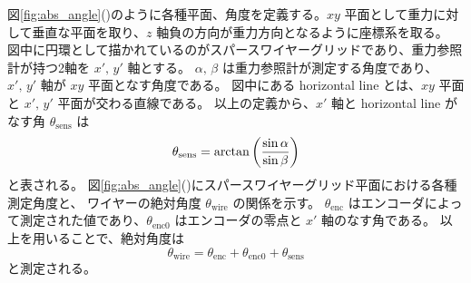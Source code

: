 \documentclass[../../main.tex]{subfiles}
\begin{document}
図\ref{fig:abs_angle}()のように各種平面、角度を定義する。$xy$ 平面として重力に対して垂直な平面を取り、$z$ 軸負の方向が重力方向となるように座標系を取る。
図中に円環として描かれているのがスパースワイヤーグリッドであり、重力参照計が持つ2軸を $x',\,y'$ 軸とする。
$\alpha,\,\beta$ は重力参照計が測定する角度であり、$x',\,y'$ 軸が $xy$ 平面となす角度である。
図中にある horizontal line とは、$xy$ 平面と $x',\,y'$ 平面が交わる直線である。
以上の定義から、$x'$ 軸と horizontal line がなす角 $\theta_{\mathrm{sens}}$ は
\begin{equation}
    \theta_{\mathrm{sens}} = \arctan\qty(\dfrac{\sin\alpha}{\sin\beta})
    \label{eq:wg_theta_sens}
\end{equation}
と表される\cite{swg:Murata_2023}。
図\ref{fig:abs_angle}()にスパースワイヤーグリッド平面における各種測定角度と、
ワイヤーの絶対角度 $\theta_{\mathrm{wire}}$ の関係を示す。
$\theta_{\mathrm{enc}}$ はエンコーダによって測定された値であり、$\theta_{\mathrm{enc}0}$ はエンコーダの零点と $x'$ 軸のなす角である。
以上を用いることで、絶対角度は
\begin{equation}
    \theta_{\mathrm{wire}} = \theta_{\mathrm{enc}} + \theta_{\mathrm{enc}0} + \theta_{\mathrm{sens}}
\end{equation}
と測定される。
\end{document}
